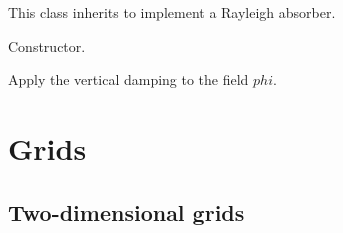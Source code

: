 \documentclass[letterpaper,10pt,english]{sphinxmanual}
\begin{document}
\begin{fulllineitems}
\label{\detokenize{api:dycore.vertical_damping.Rayleigh}}
This class inherits {\hyperref[\detokenize{api:dycore.vertical_damping.VerticalDamping}]{}} to implement a Rayleigh absorber.

\begin{fulllineitems}
\label{\detokenize{api:dycore.vertical_damping.Rayleigh.__init__}}
Constructor.

\end{fulllineitems}


\begin{fulllineitems}
\label{\detokenize{api:dycore.vertical_damping.Rayleigh.apply}}
Apply the vertical damping to the field \(phi\).

\end{fulllineitems}


\end{fulllineitems}



\section{Grids}
\label{\detokenize{api:grids}}

\subsection{Two-dimensional grids}
\label{\detokenize{api:two-dimensional-grids}}
\end{document}
